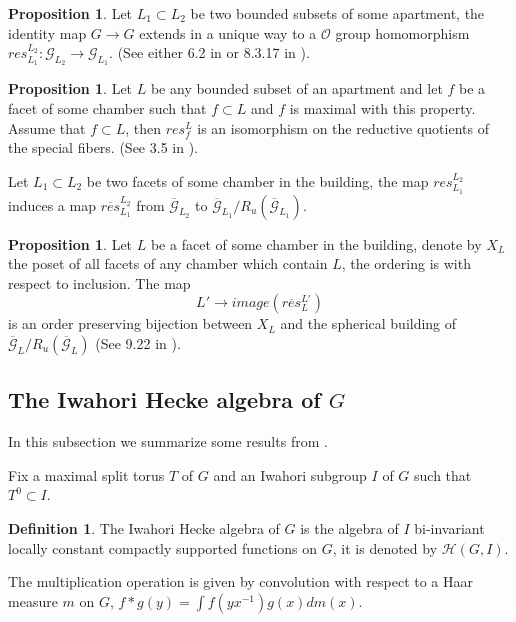 \documentclass[12pt]{article}
\newcommand{\s}{\mathcal{O}}
\newcommand{\<}{\langle}
\renewcommand{\>}{\rangle}
\theoremstyle{plain}
\theoremstyle{definition}
\newtheorem{prop}[theorem]{Proposition}
\newtheorem{defn}[theorem]{Definition} %
\begin{document}
\begin{prop}\label{restriction maps}
    Let $L_1\subset L_2$ be two bounded subsets of some apartment, the identity map $G\rightarrow G$ extends in a unique way to a $\s$ group homomorphism $res^{L_2}_{L_1}: {\mathcal G}_{L_2}\rightarrow {\mathcal G}_{L_1}$. (See either 6.2 in \cite{Landvogt1995ACO} or 8.3.17 in \cite{BruhatTitsTA}).
\end{prop}

\begin{prop}\label{face isomorphism}
    Let $L$ be any bounded subset of an apartment and let $f$ be a facet of some chamber such that $f\subset L$ and $f$ is maximal with this property. Assume that $f\subset L$, then $res^{L}_{f}$ is an isomorphism on the reductive quotients of the special fibers. (See 3.5 in \cite{Tits1979ReductiveGO}).
\end{prop}


        Let $L_1\subset L_2$ be two facets of some chamber in the building, the map $res^{L_2}_{L_1}$ induces a map $\overline{res}^{L_2}_{L_1}$ from $\overline{{\mathcal G}}_{L_2}$ to $\overline{{\mathcal G}}_{L_1}/R_u(\overline{{\mathcal G}}_{L_1})$.



    \begin{prop}\label{affine to spherical building}
    Let $L$ be a facet of some chamber in the building, denote by $X_L$ the poset of all facets of any chamber which contain $L$, the ordering is with respect to inclusion.  The map $$L'\rightarrow image(\overline{res}^{L'}_{L})$$ is an order preserving bijection between $X_L$ and the spherical building of $\overline{{\mathcal G}}_{L}/R_u(\overline{{\mathcal G}}_{L})$ (See 9.22 in \cite{Landvogt1995ACO}).
    \end{prop}
    



\subsection{The Iwahori Hecke algebra of $G$}

In this subsection we summarize some results from \cite{PMIHES_1965__25__5_0}.

Fix a maximal split torus $T$ of $G$ and an Iwahori subgroup $I$ of $G$ such that $T^0\subset I$.
\begin{defn}
The Iwahori Hecke algebra of $G$ is the algebra of $I$ bi-invariant locally constant compactly supported functions on $G$, it is denoted by $\mathcal{H}(G,I)$.

The multiplication operation is given by convolution with respect to a Haar measure $m$ on $G$, $f*g(y)=\int f(yx^{-1})g(x)dm(x)$.
\end{defn}
\end{document}
